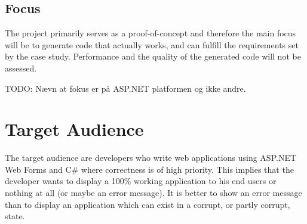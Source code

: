 	\subsection{Focus}
		The project primarily serves as a proof-of-concept and therefore the main focus will be to generate code that actually works, and can fulfill the requirements set by the case study. Performance and the quality of the generated code will not be assessed. 

		TODO: Nævn at fokus er på ASP.NET platformen og ikke andre.

\section{Target Audience}
	The target audience are developers who write web applications using ASP.NET Web Forms and C\# where correctness is of high priority. This implies that the developer wants to display a 100\% working application to his end users or nothing at all (or maybe an error message). It is better to show an error message than to display an application which can exist in a corrupt, or partly corrupt, state.


